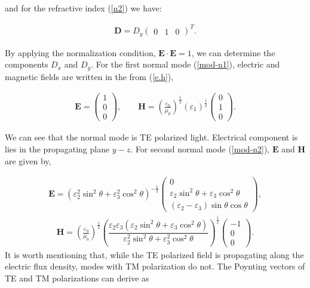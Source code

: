 \documentclass[9pt,twocolumn,twoside]{osajnl}
\begin{document}
and for the refractive index (\ref{n2}) we have:

 \begin{eqnarray}\label{mod-n2}
  \mathbf{D}=D_{y}
\begin{pmatrix}
0&1&0
\end{pmatrix}^{T}.
 \end{eqnarray}
 
By applying the normalization condition, $\mathbf{E}\cdot \mathbf{E}=1$, we can determine the components $D_{x} $ and $D_{y} $. 
For the first normal mode (\ref{mod-n1}), electric and magnetic fields are written in the from (\ref{e.h}),

\begin{align}\label{field-n1}
\mathbf{E}=
         \begin{pmatrix}
             1\\0\\0
         \end{pmatrix},
        \qquad
         \mathbf{H}=\left(\frac{\varepsilon_{0}}{\mu_{0}}\right)^{\frac{1}{2}}(\varepsilon_{1})^{\frac{1}{2}}
         \begin{pmatrix}
            0\\1\\0
        \end{pmatrix}.
\end{align}

We can see that the normal mode is TE polarized light. Electrical component is lies in the propagating plane $y-z$.
 For second normal mode (\ref{mod-n2}),  $\mathbf{E}$ and $\mathbf{H}$ are given by,

 \begin{eqnarray}
\mathbf{E}=\left(\varepsilon_{2}^{2} \sin^{2}{\theta} + \varepsilon_{3}^{2}\cos^{2}{\theta}\right)^{-\frac{1}{2}}
 \begin{pmatrix}
 0\\ \varepsilon_{2} \sin^{2}{\theta} + \varepsilon_{3}\cos^{2}{\theta}\\ (\varepsilon_{2}-\varepsilon_{3})\sin{\theta}\cos{\theta}
 \end{pmatrix},
\end{eqnarray}
\begin{eqnarray}
 \mathbf{H}=\left(\frac{\varepsilon_{0}}{\mu_{0}}\right)^{\frac{1}{2}}\left(\dfrac{\varepsilon_{2}\varepsilon_{3}\left(\varepsilon_{2} \sin^{2}{\theta} + \varepsilon_{3}\cos^{2}{\theta}\right)}{\varepsilon_{2}^{2}\sin^{2}{\theta}+\varepsilon_{3}^{2}\cos^{2}{\theta}}\right)^{\frac{1}{2}}
 \begin{pmatrix}
 -1\\0\\0
 \end{pmatrix}.
 \end{eqnarray}
It is worth mentioning that, while the TE polarized field is propagating along the electric flux density, modes with TM polarization do not. The Poynting vectors of TE and TM polarizations can derive as
\end{document}
